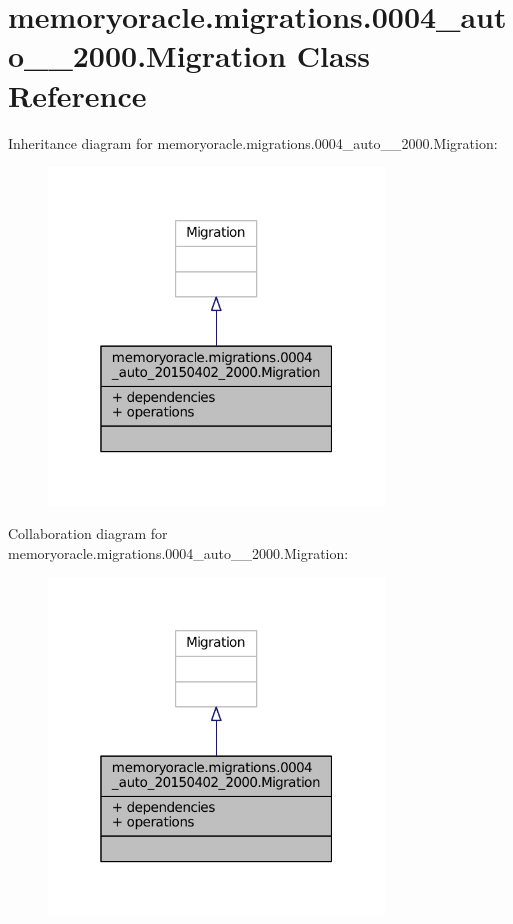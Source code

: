 \hypertarget{classmemoryoracle_1_1migrations_1_10004__auto__20150402__2000_1_1Migration}{}\section{memoryoracle.\+migrations.0004\+\_\+auto\+\_\+\_\+2000.Migration Class Reference}
\label{classmemoryoracle_1_1migrations_1_10004__auto__20150402__2000_1_1Migration}


Inheritance diagram for memoryoracle.\+migrations.0004\+\_\+auto\+\_\+\_\+2000.Migration\+:\nopagebreak
\begin{figure}[H]
\begin{center}
\leavevmode
\includegraphics[width=253pt]{classmemoryoracle_1_1migrations_1_10004__auto__20150402__2000_1_1Migration__inherit__graph}
\end{center}
\end{figure}


Collaboration diagram for memoryoracle.\+migrations.0004\+\_\+auto\+\_\+\_\+2000.Migration\+:\nopagebreak
\begin{figure}[H]
\begin{center}
\leavevmode
\includegraphics[width=253pt]{classmemoryoracle_1_1migrations_1_10004__auto__20150402__2000_1_1Migration__coll__graph}
\end{center}
\end{figure}
